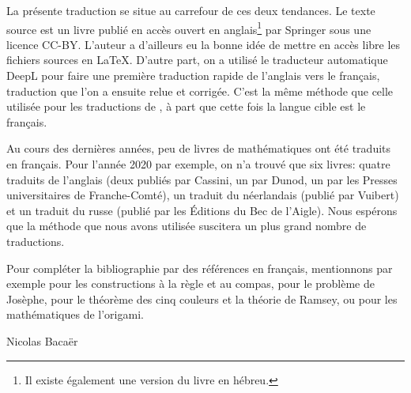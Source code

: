 La présente traduction se situe au carrefour de ces deux tendances. Le texte source est un livre publié en accès ouvert en anglais\footnote{Il existe également une version du livre en hébreu.}  par Springer sous une licence CC-BY. L'auteur a d'ailleurs eu la bonne idée de mettre en accès libre les fichiers sources en \LaTeX{}. D'autre part, on a utilisé le traducteur automatique DeepL pour faire une première traduction rapide de l'anglais vers le français, traduction que l'on a ensuite relue et corrigée. C'est la même méthode que celle utilisée pour les traductions de \cite{Bacaer,Bacaer2}, à part que cette fois la langue cible est le français.

 Au cours des dernières années, peu de livres de mathématiques ont été traduits en français. Pour l'année 2020 par exemple, on n'a trouvé que six livres: quatre    traduits de l'anglais (deux publiés par Cassini, un par Dunod, un par les Presses universitaires de Franche-Comté), un traduit du néerlandais (publié par Vuibert) et un  traduit du russe (publié par les \'Editions du Bec de l'Aigle). Nous espérons que la méthode que nous avons utilisée suscitera un plus grand nombre de traductions.

Pour compléter la bibliographie par des références en français, mentionnons par exemple \cite{Carrega,Lafforgue} pour les constructions à la règle et au compas, \cite{Signac} pour le problème de Josèphe, \cite{Aassila,Gowers} pour le théorème des cinq couleurs et  la théorie de Ramsey, ou \cite{Delahaye,Justin} pour les mathématiques de l'origami.

\medskip

\begin{flushright}
{Nicolas Bacaër}
\end{flushright}

\newpage

\rhead[\fancyplain{}{}]%
{\fancyplain{}{\thepage}}
\cfoot{}
\pagestyle{fancyplain}

\tableofcontents

